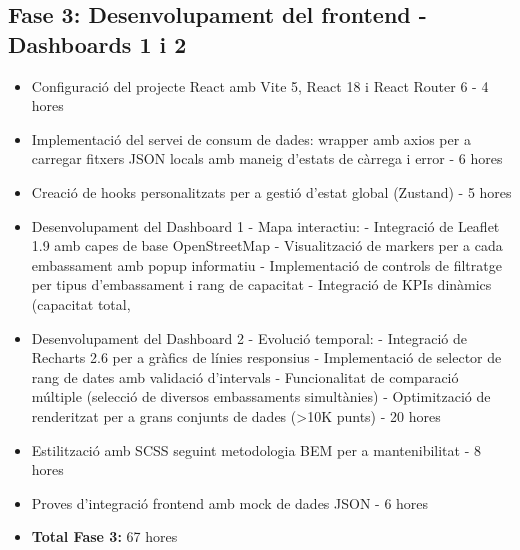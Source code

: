 \subsection{Fase 3: Desenvolupament del frontend - Dashboards 1 i 2}
\begin{itemize}
    \item Configuració del projecte React amb Vite 5, React 18 i React Router 6 - 4 hores
    \item Implementació del servei de consum de dades: wrapper amb axios per a carregar fitxers JSON locals amb maneig d'estats de càrrega i error - 6 hores
    \item Creació de hooks personalitzats per a gestió d'estat global (Zustand) - 5 hores
    \item Desenvolupament del Dashboard 1 - Mapa interactiu:
          - Integració de Leaflet 1.9 amb capes de base OpenStreetMap
          - Visualització de markers per a cada embassament amb popup informatiu
          - Implementació de controls de filtratge per tipus d'embassament i rang de capacitat
          - Integració de KPIs dinàmics (capacitat total, %
    \item Desenvolupament del Dashboard 2 - Evolució temporal:
          - Integració de Recharts 2.6 per a gràfics de línies responsius
          - Implementació de selector de rang de dates amb validació d'intervals
          - Funcionalitat de comparació múltiple (selecció de diversos embassaments simultànies)
          - Optimització de renderitzat per a grans conjunts de dades (>10K punts) - 20 hores
    \item Estilització amb SCSS seguint metodologia BEM per a mantenibilitat - 8 hores
    \item Proves d'integració frontend amb mock de dades JSON - 6 hores
    \item \textbf{Total Fase 3:} 67 hores
\end{itemize}

